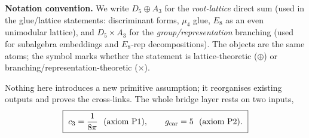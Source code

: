 \noindent\textbf{Notation convention.} We write $D_5\oplus A_3$ for the \emph{root-lattice} direct sum
(used in the glue/lattice statements: discriminant forms, $\mu_4$ glue, $E_8$ as an even unimodular
lattice), and $D_5\times A_3$ for the \emph{group/representation} branching (used for subalgebra
embeddings and $E_8$-rep decompositions). The objects are the same atoms; the symbol marks whether the
statement is lattice-theoretic ($\oplus$) or branching/representation-theoretic ($\times$).

\smallskip
\noindent Nothing here introduces a new primitive assumption; it reorganises existing outputs and
proves the cross-links. The whole bridge layer rests on two inputs,
\begin{equation}
  \boxed{\ \cthree=\frac{1}{8\pi}\ \ (\text{axiom P1}),\qquad \gcar=5\ \ (\text{axiom P2}).\ }
\end{equation}

